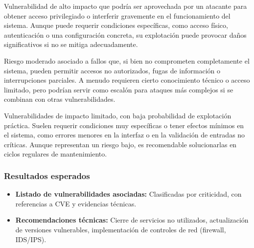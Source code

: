 \documentclass[a4paper, 11pt]{article}
\begin{document}
\vspace{0.2cm}

\begin{tcolorbox}[colback=cvsshigh!10, colframe=cvsshigh!80!black, coltitle=white,
    title=Alta (CVSS 7.0 -- 8.9)]
Vulnerabilidad de alto impacto que podría ser aprovechada por un atacante para obtener acceso privilegiado o interferir gravemente en el funcionamiento del sistema. Aunque puede requerir condiciones específicas, como acceso físico, autenticación o una configuración concreta, su explotación puede provocar daños significativos si no se mitiga adecuadamente.
\end{tcolorbox}

\vspace{0.2cm}

\begin{tcolorbox}[colback=cvssmedium!10, colframe=cvssmedium!80!black, coltitle=white,
    title=Media (CVSS 4.0 -- 6.9)]
Riesgo moderado asociado a fallos que, si bien no comprometen completamente el sistema, pueden permitir accesos no autorizados, fugas de información o interrupciones parciales. A menudo requieren cierto conocimiento técnico o acceso limitado, pero podrían servir como escalón para ataques más complejos si se combinan con otras vulnerabilidades.
\end{tcolorbox}

\vspace{0.2cm}

\begin{tcolorbox}[colback=cvsslow!10, colframe=cvsslow!80!black, coltitle=white,
    title=Baja (CVSS 0.1 -- 3.9)]
Vulnerabilidades de impacto limitado, con baja probabilidad de explotación práctica. Suelen requerir condiciones muy específicas o tener efectos mínimos en el sistema, como errores menores en la interfaz o en la validación de entradas no críticas. Aunque representan un riesgo bajo, es recomendable solucionarlas en ciclos regulares de mantenimiento.
\end{tcolorbox}



\vspace{0.5cm}
\subsubsection*{Resultados esperados}

\begin{itemize}
    \item \textbf{Listado de vulnerabilidades asociadas:} Clasificadas por criticidad, con referencias a CVE y evidencias técnicas.
    
    \item \textbf{Recomendaciones técnicas:} Cierre de servicios no utilizados, actualización de versiones vulnerables, implementación de controles de red (firewall, IDS/IPS).
\end{itemize}
\end{document}
